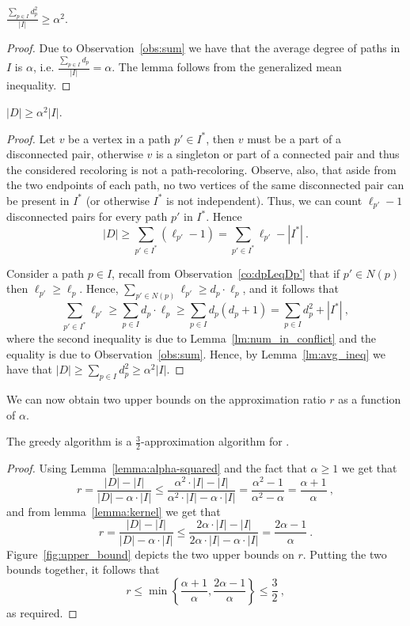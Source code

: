 \begin{lemma}
\label{lm:avg_ineq}
$\frac{\sum_{p \in I}{d_p^2}}{|I|} \geq \alpha^2$.
\end{lemma}
\begin{proof}
Due to Observation~\ref{obs:sum} we have that the average degree of
paths in $I$ is $\alpha$, i.e. $\frac{\sum_{p \in I}{d_p}}{|I|}
= \alpha$.  The lemma follows from the generalized mean inequality.
{}\end{proof}


\begin{lemma}
\label{lemma:alpha-squared}
$|D| \geq \alpha^2|I|$.
\end{lemma}
\begin{proof}
Let $v$ be a vertex in a path $p' \in I^*$, then $v$ must be a part of
a disconnected pair, otherwise $v$ is a singleton or part of a
connected pair and thus the considered recoloring is not a
path-recoloring.  Observe, also, that aside from the two endpoints of
each path, no two vertices of the same disconnected pair can be
present in $I^*$ (or otherwise $I^*$ is not independent).  Thus, we
can count $\ell_{p'} - 1$ disconnected pairs for every path $p'$ in
$I^*$.  Hence
\[
|D| \geq \sum_{p' \in I^*} (\ell_{p'} - 1) = \sum_{p' \in I^*}{\ell_{p'}} -
|I^*| ~.
\]

Consider a path $p \in I$, 
recall from Observation~\ref{co:dpLeqDp'} that if $p' \in N(p)$ 
then $\ell_{p'} \geq \ell_p$.
%
Hence, 
$\sum_{p' \in N(p)}{\ell_{p'}} \geq d_p \cdot \ell_p$, 
and it follows that
\[
\sum_{p' \in I^*} \ell_{p'}
\geq \sum_{p \in I} d_p \cdot \ell_p
\geq \sum_{p \in I} d_p(d_p+1)
=    \sum_{p \in I} d_p^2 + |I^*|
~,
\]
where the second inequality is due to Lemma~\ref{lm:num_in_conflict}
and the equality is due to Observation~\ref{obs:sum}.
Hence, by Lemma~\ref{lm:avg_ineq} we have that
\(
|D| \geq \sum_{p \in I} d_p^2 \geq \alpha^2 |I|
\).
{}\end{proof}

We can now obtain two upper bounds on the approximation ratio $r$ as a
function of $\alpha$. 

\begin{theorem}
The greedy algorithm is a $\frac{3}{2}$-approximation algorithm for
\TWOCR{}.
\end{theorem}
\begin{proof}
Using Lemma~\ref{lemma:alpha-squared} and the fact that $\alpha \geq 1$ we get
that
$$
r
=    \frac{|D| - |I|}{|D| - \alpha \cdot |I|}
\leq \frac{\alpha ^ 2 \cdot |I| - |I|}{\alpha ^ 2 \cdot |I| - \alpha \cdot |I|}
=    \frac{\alpha ^ 2 - 1}{\alpha ^ 2 - \alpha}
=    \frac{\alpha+1}{\alpha}
~, 
$$
and from lemma~\ref{lemma:kernel} we get that
$$
r
=    \frac{|D| - |I|}{|D| - \alpha \cdot |I|}
\leq \frac{2 \alpha \cdot |I| - |I|}{2 \alpha \cdot |I| - \alpha \cdot |I|}
=    \frac{2 \alpha - 1}{\alpha}
~.
$$
Figure~\ref{fig:upper_bound} depicts the two upper bounds on $r$.
Putting the two bounds together, it follows that
\[
r
\leq \min \left\{\frac{\alpha+1}{\alpha} , \frac{2\alpha-1}{\alpha} \right\}
\leq    \frac{3}{2}
~,
\]
as required.
\end{proof}



